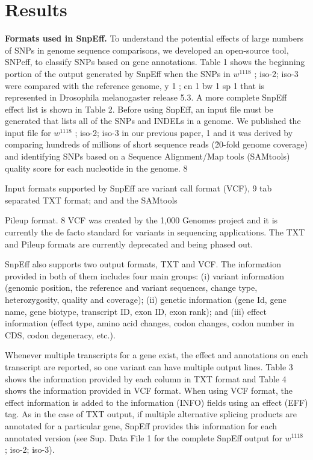 \section{Results}

\textbf{Formats used in SnpEff.} To understand the potential effects of large numbers of SNPs in genome sequence comparisons, we developed an open-source tool, SNPeff, to classify SNPs based on gene annotations. Table 1 shows the beginning portion of the output generated by SnpEff when the SNPs in $w^{1118}$ ; iso-2; iso-3 were compared with the reference genome, y 1 ; cn 1 bw 1 sp 1 that is represented in Drosophila melanogaster release 5.3. A more complete SnpEff effect list is shown in Table 2. Before using SnpEff, an input file must be generated that lists all of the SNPs and INDELs in a genome. We published the input file for $w^{1118}$ ; iso-2; iso-3 in our previous paper, 1 and it was derived by comparing hundreds of millions of short sequence reads (\~20-fold genome coverage) and identifying SNPs based on a Sequence Alignment/Map tools (SAMtools) quality score for each nucleotide in the genome. 8

Input formats supported by SnpEff are variant call format (VCF), 9 tab separated TXT format; and and the SAMtools

Pileup format. 8 VCF was created by the 1,000 Genomes project and it is currently the de facto standard for variants in sequencing applications. The TXT and Pileup formats are currently deprecated and being phased out.

SnpEff also supports two output formats, TXT and VCF. The information provided in both of them includes four main groups: (i) variant information (genomic position, the reference and variant sequences, change type, heterozygosity, quality and coverage); (ii) genetic information (gene Id, gene name, gene biotype, transcript ID, exon ID, exon rank); and (iii) effect information (effect type, amino acid changes, codon changes, codon number in CDS, codon degeneracy, etc.).

Whenever multiple transcripts for a gene exist, the effect and annotations on each transcript are reported, so one variant can have multiple output lines. Table 3 shows the information provided by each column in TXT format and Table 4 shows the information provided in VCF format. When using VCF format, the effect information is added to the information (INFO) fields using an effect (EFF) tag. As in the case of TXT output, if multiple alternative splicing products are annotated for a particular gene, SnpEff provides this information for each annotated version (see Sup. Data File 1 for the complete SnpEff output for $w^{1118}$ ; iso-2; iso-3).

